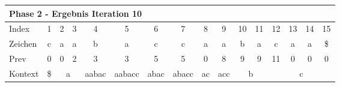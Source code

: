 \begin{table}[H]
\caption[Konstruktion des Suffix Arrays f{\"u}r das Wort caabaccaabacaa: Phase 2, Iteration 9]{Konstruktion des Suffix Arrays f{\"u}r das Wort caabaccaabacaa: Phase 2, Iteration 9. Betrachteter Index: 9, enthaltener Wert: 5, Vorg{\"a}ngerelement: 4, \prevpointer-Kette: 3 $\rightarrow$ 2 $\rightarrow$ 0. Element 4 wird in SA aufgenommen.}
\label{table_complex_example_2_9} 
\end{table}

\begin{table}[H]
\centering
\begin{adjustbox}{max width=\textwidth}
\centering
\begin{tabular}{lccccccccccccccc}
\multicolumn{16}{l}{Phase 2 - Ergebnis Iteration 10}                                                                                                                                                                                                                                                                                          \\ \hline
\multicolumn{1}{l|}{Index}   & 1                       & 2  & 3                       & 4                          & 5                           & 6                         & 7                          & 8                       & 9                        & 10                         & 11                      & 12  & 13  & 14  & 15  \\
\multicolumn{1}{l|}{Zeichen} & c                       & a  & a                       & b                          & a                           & c                         & c                          & a                       & a                        & b                          & a                       & c   & a   & a   & \$  \\
\multicolumn{1}{l|}{Prev}    & 0                       & 0  & 2                       & 3                          & 3                           & 5                         & 5                          & 0                       & 8                        & 9                          & 9                       & 11  & 0   & 0   & 0   \\ \hline
\multicolumn{1}{l|}{Kontext} & \multicolumn{1}{c|}{\$} & \multicolumn{2}{c|}{a}       & \multicolumn{1}{c|}{aabac} & \multicolumn{1}{c|}{aabacc} & \multicolumn{1}{c|}{abac} & \multicolumn{1}{c|}{abacc} & \multicolumn{1}{c|}{ac} & \multicolumn{1}{c|}{acc} & \multicolumn{2}{c|}{b}                               & \multicolumn{4}{c}{c} \\

\end{tabular}
\end{adjustbox}
\end{table}

